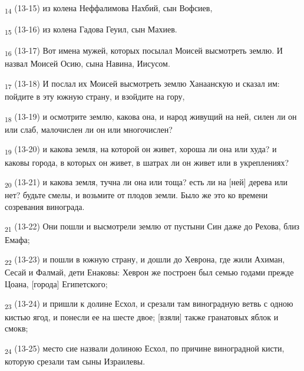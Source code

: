 \begin{tcolorbox}
\textsubscript{14} (13-15) из колена Неффалимова Нахбий, сын Вофсиев,
\end{tcolorbox}
\begin{tcolorbox}
\textsubscript{15} (13-16) из колена Гадова Геуил, сын Махиев.
\end{tcolorbox}
\begin{tcolorbox}
\textsubscript{16} (13-17) Вот имена мужей, которых посылал Моисей высмотреть землю. И назвал Моисей Осию, сына Навина, Иисусом.
\end{tcolorbox}
\begin{tcolorbox}
\textsubscript{17} (13-18) И послал их Моисей высмотреть землю Ханаанскую и сказал им: пойдите в эту южную страну, и взойдите на гору,
\end{tcolorbox}
\begin{tcolorbox}
\textsubscript{18} (13-19) и осмотрите землю, какова она, и народ живущий на ней, силен ли он или слаб, малочислен ли он или многочислен?
\end{tcolorbox}
\begin{tcolorbox}
\textsubscript{19} (13-20) и какова земля, на которой он живет, хороша ли она или худа? и каковы города, в которых он живет, в шатрах ли он живет или в укреплениях?
\end{tcolorbox}
\begin{tcolorbox}
\textsubscript{20} (13-21) и какова земля, тучна ли она или тоща? есть ли на [ней] дерева или нет? будьте смелы, и возьмите от плодов земли. Было же это ко времени созревания винограда.
\end{tcolorbox}
\begin{tcolorbox}
\textsubscript{21} (13-22) Они пошли и высмотрели землю от пустыни Син даже до Рехова, близ Емафа;
\end{tcolorbox}
\begin{tcolorbox}
\textsubscript{22} (13-23) и пошли в южную страну, и дошли до Хеврона, где жили Ахиман, Сесай и Фалмай, дети Енаковы: Хеврон же построен был семью годами прежде Цоана, [города] Египетского;
\end{tcolorbox}
\begin{tcolorbox}
\textsubscript{23} (13-24) и пришли к долине Есхол, и срезали там виноградную ветвь с одною кистью ягод, и понесли ее на шесте двое; [взяли] также гранатовых яблок и смокв;
\end{tcolorbox}
\begin{tcolorbox}
\textsubscript{24} (13-25) место сие назвали долиною Есхол, по причине виноградной кисти, которую срезали там сыны Израилевы.
\end{tcolorbox}
